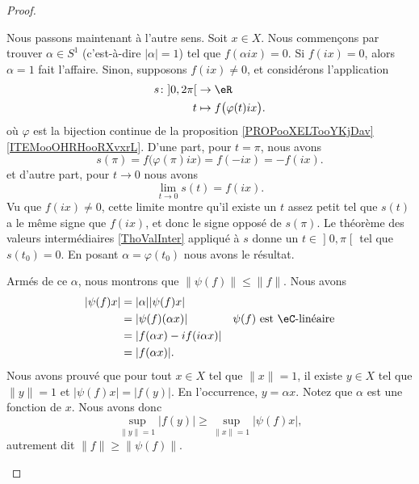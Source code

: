\begin{proof}
\begin{subproof}
\begin{subproof}

			Nous passons maintenant à l'autre sens. Soit \( x\in X\). Nous commençons par trouver \( \alpha\in S^1\) (c'est-à-dire \( | \alpha |=1\)) tel que \( f(\alpha ix)=0\). Si \( f(ix)=0\), alors \( \alpha=1\) fait l'affaire. Sinon, supposons \( f(ix)\neq 0\), et considérons l'application
			\begin{equation}
				\begin{aligned}
					s\colon \mathopen] 0,2\pi\mathclose[ & \to \eR                            \\
					t                                    & \mapsto f\big( \varphi(t)ix \big).
				\end{aligned}
			\end{equation}
			où \( \varphi\) est la bijection continue de la proposition \ref{PROPooXELTooYKjDav}\ref{ITEMooOHRHooRXvxrL}. D'une part, pour \( t=\pi\), nous avons
			\begin{equation}
				s(\pi)=f\big( \varphi(\pi)ix \big)=f(-ix)=-f(ix).
			\end{equation}
			et d'autre part, pour \( t\to 0\) nous avons
			\begin{equation}
				\lim_{t\to 0}s(t)=f(ix).
			\end{equation}
			Vu que \( f(ix)\neq 0\), cette limite montre qu'il existe un \( t\) assez petit tel que \( s(t)\) a le même signe que \( f(ix)\), et donc le signe opposé de \( s(\pi)\). Le théorème des valeurs intermédiaires \ref{ThoValInter} appliqué à \( s\) donne un \( t\in \mathopen] 0,\pi\mathclose[\) tel que \( s(t_0)=0\). En posant \( \alpha=\varphi(t_0)\) nous avons le résultat.

			Armés de ce \( \alpha\), nous montrons que \( \| \psi(f) \|\leq \| f \|\). Nous avons
			\begin{subequations}
				\begin{align}
					| \psi(f)x | & =| \alpha || \psi(f)x |                                                    \\
					             & =| \psi(f)(\alpha x) |         & \text{\( \psi(f)\) est \( \eC\)-linéaire} \\
					             & =| f(\alpha x)-if(i\alpha x) |                                             \\
					             & =| f(\alpha x) |.
				\end{align}
			\end{subequations}
			Nous avons prouvé que pour tout \( x\in X\) tel que \( \| x \|=1\), il existe \( y\in X\) tel que \( \| y \|=1\) et \( | \psi(f)x |=| f(y) |\). En l'occurrence, \( y=\alpha x\). Notez que \( \alpha\) est une fonction de \( x\). Nous avons donc
			\begin{equation}
				\sup_{\| y \|=1}| f(y) |\geq \sup_{\| x \|=1}| \psi(f)x |,
			\end{equation}
			autrement dit \( \| f \|\geq \| \psi(f) \|\).
		\end{subproof}


\end{subproof}
\end{proof}
